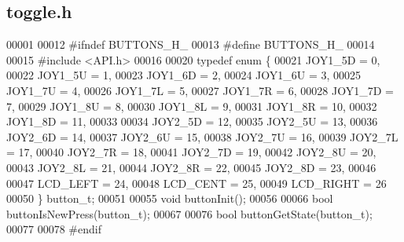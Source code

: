 \subsection{toggle.\+h}
\label{toggle_8h_source}

\begin{DoxyCode}
00001 
00012 \textcolor{preprocessor}{#ifndef BUTTONS\_H\_}
00013 \textcolor{preprocessor}{#define BUTTONS\_H\_}
00014 
00015 \textcolor{preprocessor}{#include <API.h>}
00016 
00020 \textcolor{keyword}{typedef} \textcolor{keyword}{enum} \{
00021     JOY1_5D = 0,
00022     JOY1_5U = 1,
00023     JOY1_6D = 2,
00024     JOY1_6U = 3,
00025     JOY1_7U = 4,
00026     JOY1_7L = 5,
00027     JOY1_7R = 6,
00028     JOY1_7D = 7,
00029     JOY1_8U = 8,
00030     JOY1_8L = 9,
00031     JOY1_8R = 10,
00032     JOY1_8D = 11,
00033 
00034     JOY2_5D = 12,
00035     JOY2_5U = 13,
00036     JOY2_6D = 14,
00037     JOY2_6U = 15,
00038     JOY2_7U = 16,
00039     JOY2_7L = 17,
00040     JOY2_7R = 18,
00041     JOY2_7D = 19,
00042     JOY2_8U = 20,
00043     JOY2_8L = 21,
00044     JOY2_8R = 22,
00045     JOY2_8D = 23,
00046 
00047     LCD_LEFT = 24,
00048     LCD_CENT = 25,
00049     LCD_RIGHT = 26
00050 \} button_t;
00051 
00055 \textcolor{keywordtype}{void} buttonInit();
00056 
00066 \textcolor{keywordtype}{bool} buttonIsNewPress(button_t);
00067 
00076 \textcolor{keywordtype}{bool} buttonGetState(button_t);
00077 
00078 \textcolor{preprocessor}{#endif}
\end{DoxyCode}

